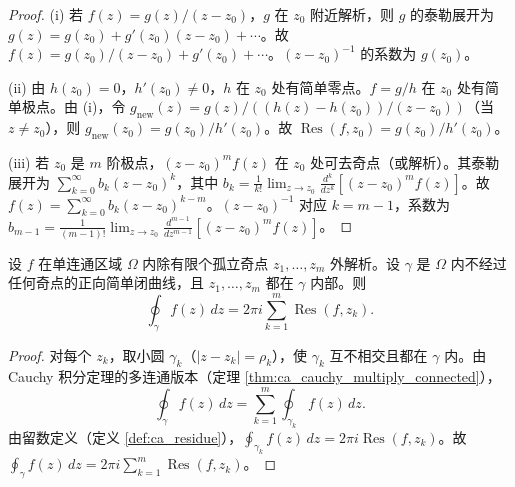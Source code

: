 \begin{proof}
(i) 若 $f(z) = g(z)/(z - z_0)$，$g$ 在 $z_0$ 附近解析，则 $g$ 的泰勒展开为 $g(z) = g(z_0) + g'(z_0)(z - z_0) + \cdots$。故 $f(z) = g(z_0)/(z - z_0) + g'(z_0) + \cdots$。$(z - z_0)^{-1}$ 的系数为 $g(z_0)$。

(ii) 由 $h(z_0) = 0$，$h'(z_0) \neq 0$，$h$ 在 $z_0$ 处有简单零点。$f = g/h$ 在 $z_0$ 处有简单极点。由 (i)，令 $g_{\text{new}}(z) = g(z)/((h(z) - h(z_0))/(z - z_0))$（当 $z \neq z_0$），则 $g_{\text{new}}(z_0) = g(z_0)/h'(z_0)$。故 $\operatorname{Res}(f, z_0) = g(z_0)/h'(z_0)$。

(iii) 若 $z_0$ 是 $m$ 阶极点，$(z - z_0)^m f(z)$ 在 $z_0$ 处可去奇点（或解析）。其泰勒展开为 $\sum_{k=0}^{\infty} b_k (z - z_0)^k$，其中 $b_k = \frac{1}{k!} \lim_{z \to z_0} \frac{d^k}{dz^k} [(z - z_0)^m f(z)]$。故 $f(z) = \sum_{k=0}^{\infty} b_k (z - z_0)^{k-m}$。$(z - z_0)^{-1}$ 对应 $k = m-1$，系数为 $b_{m-1} = \frac{1}{(m-1)!} \lim_{z \to z_0} \frac{d^{m-1}}{dz^{m-1}} [(z - z_0)^m f(z)]$。
\end{proof}

\begin{theorem}[留数定理]\label{thm:ca_residue_theorem}
设 $f$ 在单连通区域 $\Omega$ 内除有限个孤立奇点 $z_1, \dots, z_m$ 外解析。设 $\gamma$ 是 $\Omega$ 内不经过任何奇点的正向简单闭曲线，且 $z_1, \dots, z_m$ 都在 $\gamma$ 内部。则
\[
\oint_\gamma f(z) \, dz = 2\pi i \sum_{k=1}^{m} \operatorname{Res}(f, z_k).
\]
\end{theorem}

\begin{proof}
对每个 $z_k$，取小圆 $\gamma_k$（$|z - z_k| = \rho_k$），使 $\gamma_k$ 互不相交且都在 $\gamma$ 内。由 Cauchy 积分定理的多连通版本（定理 \ref{thm:ca_cauchy_multiply_connected}），
\[
\oint_\gamma f(z) \, dz = \sum_{k=1}^{m} \oint_{\gamma_k} f(z) \, dz.
\]
由留数定义（定义 \ref{def:ca_residue}），$\oint_{\gamma_k} f(z) \, dz = 2\pi i \operatorname{Res}(f, z_k)$。故 $\oint_\gamma f(z) \, dz = 2\pi i \sum_{k=1}^{m} \operatorname{Res}(f, z_k)$。
\end{proof}


